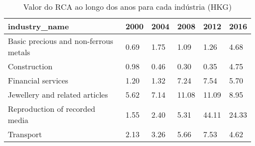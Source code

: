 \begin{table}
\centering
\caption{Valor do RCA ao longo dos anos para cada indústria (HKG)}
\begin{tabular}{p{6cm}p{1.5cm}p{1.5cm}p{1.5cm}p{1.5cm}p{1.5cm}}
\toprule
                        industry\_name & 2000 & 2004 &  2008 &  2012 &  2016 \\
\midrule
Basic precious and non-ferrous metals & 0.69 & 1.75 &  1.09 &  1.26 &  4.68 \\
                         Construction & 0.98 & 0.46 &  0.30 &  0.35 &  4.75 \\
                   Financial services & 1.20 & 1.32 &  7.24 &  7.54 &  5.70 \\
       Jewellery and related articles & 5.62 & 7.14 & 11.08 & 11.09 &  8.95 \\
       Reproduction of recorded media & 1.55 & 2.40 &  5.31 & 44.11 & 24.33 \\
                            Transport & 2.13 & 3.26 &  5.66 &  7.53 &  4.62 \\
\bottomrule
\end{tabular}
\end{table}

